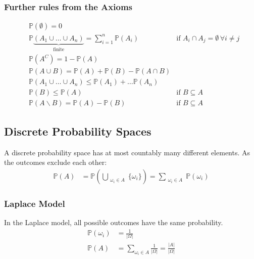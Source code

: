\subsubsection{Further rules from the Axioms}\label{sssec:rules_from_axioms}
\noindent\begin{align*}
     & \mathbb{P}(\emptyset) = 0                                                                                                                                  \\
     & \mathbb{P}  \underbrace{(A_1 \cup \dots \cup A_n)}_{\text{finite}} = \sum_{i=1}^{n} \mathbb{P}(A_i) & \text{if } A_i\cap A_j = \emptyset\, \forall i\neq j \\
     & \mathbb{P}(A^C) = 1-\mathbb{P}(A)                                                                                                                          \\
     & \mathbb{P}(A\cup B) = \mathbb{P}(A)+\mathbb{P}(B) - \mathbb{P}(A\cap B)                                                                                    \\
     & \mathbb{P}(A_1 \cup \dots \cup A_n) \leq \mathbb{P}(A_1)+\dots \mathbb{P}(A_n)                                                                             \\
     & \mathbb{P}(B) \leq \mathbb{P}(A)                                                                    & \text{if } B\subseteq A                              \\
     & \mathbb{P}(A\backslash B) = \mathbb{P}(A)-\mathbb{P}(B)                                             & \text{if } B\subseteq A
\end{align*}

\subsection{Discrete Probability Spaces}
A discrete probability space has at most countably many different elements. As the outcomes exclude each other:
\noindent\begin{align*}
    \mathbb{P}(A) & = \mathbb{P}\left(\bigcup_{\substack{\omega_i \in A}}\{\omega_i\}\right)= \sum_{\substack{\omega_i \in A}} \mathbb{P}(\omega_i)
\end{align*}
\subsubsection{Laplace Model}
In the Laplace model, all possible outcomes have the same probability.
\noindent\begin{align*}
    \mathbb{P}(\omega_i) & = \frac{1}{|\Omega|}                                             \\
    \mathbb{P}(A)        & = \sum_{\omega_i \in A}\frac{1}{|\Omega|} = \frac{|A|}{|\Omega|}
\end{align*}

